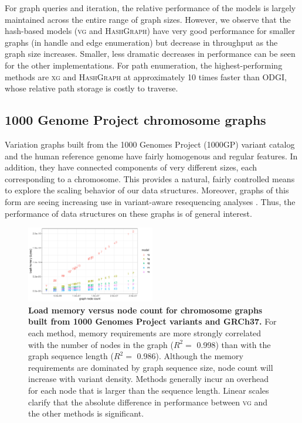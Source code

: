 \documentclass{bioinfo}
\begin{document}
For graph queries and iteration, the relative performance of the models is largely maintained across the entire range of graph sizes.
However, we observe that the hash-based models (\textsc{vg} and \textsc{HashGraph}) have very good performance for smaller graphs (in handle and edge enumeration) but decrease in throughput as the graph size increases.
Smaller, less dramatic decreases in performance can be seen for the other implementations.
For path enumeration, the highest-performing methods are \textsc{xg} and \textsc{HashGraph} at approximately 10 times faster than \textsc{ODGI}, whose relative path storage is costly to traverse.

\subsection{1000 Genome Project chromosome graphs}

Variation graphs built from the 1000 Genomes Project (1000GP) variant catalog and the human reference genome have fairly homogenous and regular features.
In addition, they have connected components of very different sizes, each corresponding to a chromosome.
This provides a natural, fairly controlled means to explore the scaling behavior of our data structures.
Moreover, graphs of this form are seeing increasing use in variant-aware resequencing analyses \citep{crysnanto2019sequence}.
Thus, the performance of data structures on these graphs is of general interest.

\begin{figure}[p]
  \centering
  \includegraphics[width=0.5\textwidth]{figures/1000gp_chroms_node_count.pdf}
  \caption{
    \label{fig:1000GPchroms}
    \textbf{Load memory versus node count for chromosome graphs built from 1000 Genomes Project variants and GRCh37.}
    For each method, memory requirements are more strongly correlated with the number of nodes in the graph ($R^2 =$ 0.998) than with the graph sequence length ($R^2 =$ 0.986).
    Although the memory requirements are dominated by graph sequence size, node count will increase with variant density.
    Methods generally incur an overhead for each node that is larger than the sequence length.
    Linear scales clarify that the absolute difference in performance between \textsc{vg} and the other methods is significant.
    }
\end{figure}
\end{document}

